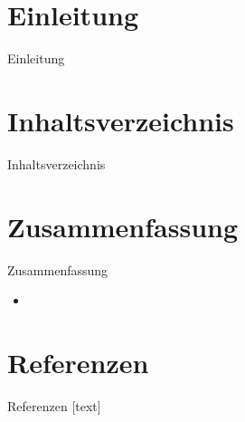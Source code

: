 \documentclass[11pt,aspectratio=1610,dvipsnames]{beamer}
\begin{document}
\section*{Einleitung}
\begin{frame}{Einleitung}
	\begin{tcolorbox}[colback=black!5,colframe=gray!15!black,title=\textsc{Bayes'} Theorem] 
\end{tcolorbox}
\end{frame}


\section*{Inhaltsverzeichnis}

\begin{frame}{Inhaltsverzeichnis}
	\tableofcontents
\end{frame}



\section{Zusammenfassung}
\begin{frame}{Zusammenfassung}
	\begin{tcolorbox}[colback=black!5,colframe=gray!15!black,title=, width=\linewidth]
		\begin{itemize}
			\item 
		\end{itemize}
	\end{tcolorbox}
\end{frame}

\section*{Referenzen}
\begin{frame}[allowframebreaks]{Referenzen}
	[text]
	
	
\end{frame}
\end{document}
